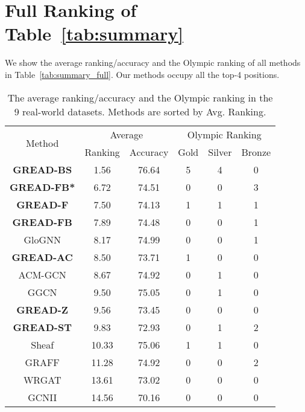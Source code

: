 \documentclass{article}
\theoremstyle{plain}
\theoremstyle{definition}
\theoremstyle{remark}
\begin{document}




\clearpage
\onecolumn
\appendix


\section{Full Ranking of Table~\ref{tab:summary}}\label{a:full_rank}
We show the average ranking/accuracy and the Olympic ranking of all methods in Table~\ref{tab:summary_full}. Our methods occupy all the top-4 positions.

\begin{table}[ht]
    \centering
    \caption{The average ranking/accuracy and the Olympic ranking in the 9 real-world datasets. Methods are sorted by Avg. Ranking.}
    \begin{tabular}{c cc ccc} \toprule
        \multirow{2}{*}{Method} & \multicolumn{2}{c}{Average} 
                                                           & \multicolumn{3}{c}{Olympic Ranking}\\  \cmidrule(lr){2-3}\cmidrule(lr){4-6}
                 & Ranking & Accuracy                      & Gold & Silver & Bronze\\ \midrule
        \textbf{GREAD-BS} 
                 & 1.56   & 76.64 & 5 & 4 & 0\\
        \textbf{GREAD-FB*}
                 & 6.72   & 74.51 & 0 & 0 & 3\\
        \textbf{GREAD-F}  
                 & 7.50   & 74.13 & 1 & 1 & 1\\
        \textbf{GREAD-FB} 
                 & 7.89   & 74.48 & 0 & 0 & 1\\
        GloGNN   & 8.17   & 74.99 & 0 & 0 & 1\\
        \textbf{GREAD-AC} 
                 & 8.50   & 73.71 & 1 & 0 & 0\\ 
        ACM-GCN  & 8.67   & 74.92 & 0 & 1 & 0\\
        GGCN     & 9.50   & 75.05 & 0 & 1 & 0\\
        \textbf{GREAD-Z}  
                 & 9.56   & 73.45 & 0 & 0 & 0\\
        \textbf{GREAD-ST} 
                 & 9.83   & 72.93 & 0 & 1 & 2\\
        Sheaf	 & 10.33  & 75.06 & 1 & 1 & 0\\
        GRAFF	 & 11.28  & 74.92 & 0 & 0 & 2\\
        WRGAT	 & 13.61  & 73.02 & 0 & 0 & 0\\
        GCNII	 & 14.56  & 70.16 & 0 & 0 & 0\\

\end{tabular}
\end{table}
\end{document}

